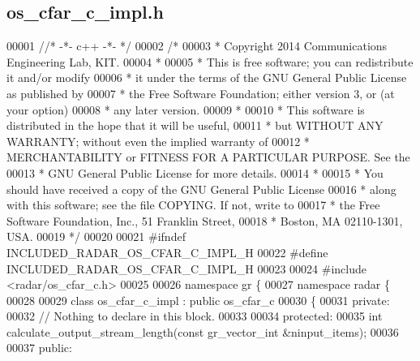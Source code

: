 \subsection{os\+\_\+cfar\+\_\+c\+\_\+impl.\+h}
\label{os__cfar__c__impl_8h_source}

\begin{DoxyCode}
00001 \textcolor{comment}{//* -*- c++ -*- */}
00002 \textcolor{comment}{/* }
00003 \textcolor{comment}{ * Copyright 2014 Communications Engineering Lab, KIT.}
00004 \textcolor{comment}{ * }
00005 \textcolor{comment}{ * This is free software; you can redistribute it and/or modify}
00006 \textcolor{comment}{ * it under the terms of the GNU General Public License as published by}
00007 \textcolor{comment}{ * the Free Software Foundation; either version 3, or (at your option)}
00008 \textcolor{comment}{ * any later version.}
00009 \textcolor{comment}{ * }
00010 \textcolor{comment}{ * This software is distributed in the hope that it will be useful,}
00011 \textcolor{comment}{ * but WITHOUT ANY WARRANTY; without even the implied warranty of}
00012 \textcolor{comment}{ * MERCHANTABILITY or FITNESS FOR A PARTICULAR PURPOSE.  See the}
00013 \textcolor{comment}{ * GNU General Public License for more details.}
00014 \textcolor{comment}{ * }
00015 \textcolor{comment}{ * You should have received a copy of the GNU General Public License}
00016 \textcolor{comment}{ * along with this software; see the file COPYING.  If not, write to}
00017 \textcolor{comment}{ * the Free Software Foundation, Inc., 51 Franklin Street,}
00018 \textcolor{comment}{ * Boston, MA 02110-1301, USA.}
00019 \textcolor{comment}{ */}
00020  
00021 \textcolor{preprocessor}{#ifndef INCLUDED\_RADAR\_OS\_CFAR\_C\_IMPL\_H}
00022 \textcolor{preprocessor}{#define INCLUDED\_RADAR\_OS\_CFAR\_C\_IMPL\_H}
00023 
00024 \textcolor{preprocessor}{#include <radar/os_cfar_c.h>}
00025 
00026 \textcolor{keyword}{namespace }gr \{
00027   \textcolor{keyword}{namespace }radar \{
00028 
00029     \textcolor{keyword}{class }os_cfar_c_impl : \textcolor{keyword}{public} os_cfar_c
00030     \{
00031      \textcolor{keyword}{private}:
00032       \textcolor{comment}{// Nothing to declare in this block.}
00033 
00034      \textcolor{keyword}{protected}:
00035       \textcolor{keywordtype}{int} calculate_output_stream_length(\textcolor{keyword}{const} gr\_vector\_int &ninput\_items);
00036 
00037      \textcolor{keyword}{public}:

\end{DoxyCode}
